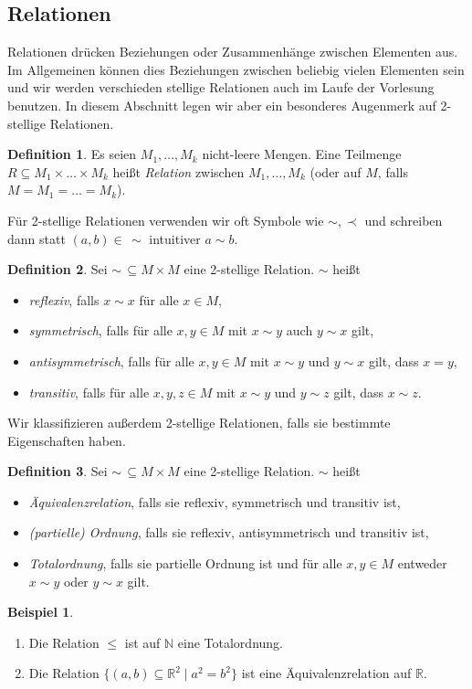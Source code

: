 \documentclass[11pt, a4paper]{article}
\theoremstyle{definition}
\newtheorem{definition}{Definition}[section]
\newtheorem*{example*}{Beispiel}
\theoremstyle{plain}
\numberwithin{equation}{section}
\begin{document}
\subsection{Relationen}\label{sec:pre_relations}
Relationen drücken Beziehungen oder Zusammenhänge zwischen Elementen aus. Im Allgemeinen können dies Beziehungen zwischen beliebig vielen Elementen sein und wir werden verschieden stellige Relationen auch im Laufe der Vorlesung benutzen. In diesem Abschnitt legen wir aber ein besonderes Augenmerk auf 2-stellige Relationen.
\begin{definition}
	Es seien \( M_1, \ldots, M_k \) nicht-leere Mengen. Eine Teilmenge \( R \subseteq M_1 \times \ldots \times M_k \) heißt \textit{Relation} zwischen \( M_1, \ldots, M_k \) (oder auf \( M \), falls \( M = M_1 = \ldots = M_k \)).
\end{definition}
Für 2-stellige Relationen verwenden wir oft Symbole wie \( \sim, \prec \) und schreiben dann statt \( (a, b) \in\, \sim \) intuitiver \( a \sim b \).
\begin{definition}
	Sei \( \sim \,\subseteq M \times M \) eine 2-stellige Relation. \( \sim \) heißt
	\begin{itemize}
		\item \textit{reflexiv}, falls \( x \sim x \) für alle \( x \in M \),
		\item \textit{symmetrisch}, falls für alle \( x, y \in M \) mit \( x \sim y \) auch \( y \sim x \) gilt,
		\item \textit{antisymmetrisch}, falls für alle \( x, y \in M \) mit \( x \sim y \) und \( y \sim x \) gilt, dass \( x = y \),
		\item \textit{transitiv}, falls für alle \( x, y, z \in M \) mit \( x \sim y \) und \( y \sim z \) gilt, dass \( x \sim z \).
	\end{itemize}
\end{definition}
Wir klassifizieren außerdem 2-stellige Relationen, falls sie bestimmte Eigenschaften haben.
\begin{definition}
	Sei \( \sim \,\subseteq M \times M \) eine 2-stellige Relation. \( \sim \) heißt
	\begin{itemize}
		\item \textit{Äquivalenzrelation}, falls sie reflexiv, symmetrisch und transitiv ist,
		\item \textit{(partielle) Ordnung}, falls sie reflexiv, antisymmetrisch und transitiv ist,
		\item \textit{Totalordnung}, falls sie partielle Ordnung ist und für alle \( x, y \in M \) entweder \( x \sim y \) oder \( y \sim x \) gilt. 
	\end{itemize}	 
\end{definition}
\begin{example*}
	\
	\begin{enumerate}
		\item Die Relation \( \leq \) ist auf \( \mathbb{N} \) eine Totalordnung.
		\item Die Relation \( \{(a, b) \subseteq \mathbb{R}^2 \mid a^2 = b^2 \} \) ist eine Äquivalenzrelation auf \( \mathbb{R} \).
	\end{enumerate}
\end{example*}
\end{document}
